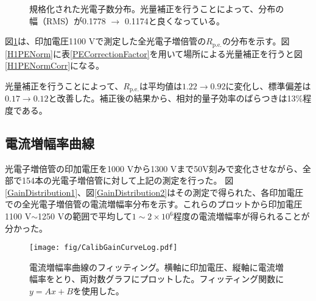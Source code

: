 \documentclass[11pt]{ltjsreport}
\newcommand{\figref}[1]{図\ref{#1}}
\newcommand{\tabref}[1]{表\ref{#1}}
\newcommand{\pe}{\mathrm{p.e.}}
\begin{document}
\begin{figure}[!h]
\centering
  \begin{minipage}{0.8\textwidth}
  \end{minipage}
  \begin{minipage}{0.8\textwidth}
  \end{minipage}
    \caption[規格化された光電子数分布]{規格化された光電子数分布。光量補正を行うことによって、分布の幅（RMS）が0.1778 $\rightarrow$ 0.1174と良くなっている。}
  \label{H1PECorr}
\end{figure}

\figref{H1PECorr}は、印加電圧1100 Vで測定した全光電子増倍管の$R_{\pe}$の分布を示す。\figref{H1PENorm}に\tabref{PECorrectionFactor}を用いて場所による光量補正を行うと\figref{H1PENormCorr}になる。

光量補正を行うことによって、$R_{\pe}$は平均値は$1.22 \rightarrow 0.92$に変化し、標準偏差は$0.17 \rightarrow 0.12$と改善した。補正後の結果から、相対的量子効率のばらつきは13\%程度である。




\subsection{電流増幅率曲線}
光電子増倍管の印加電圧を1000 Vから1300 Vまで50V刻みで変化させながら、全部で154本の光電子増倍管に対して上記の測定を行った。
\figref{GainDistribution1}、\figref{GainDistribution2}はその測定で得られた、各印加電圧での全光電子増倍管の電流増幅率分布を示す。これらのプロットから印加電圧1100 V$\sim$1250 Vの範囲で平均して$1\sim2\times 10^{6}$程度の電流増幅率が得られることが分かった。



\begin{figure}[htbp]
\centering
\texttt{[image: fig/CalibGainCurveLog.pdf]}
\caption[電流増幅率曲線のフィッティング]{電流増幅率曲線のフィッティング。横軸に印加電圧、縦軸に電流増幅率をとり、両対数グラフにプロットした。フィッティング関数に$y=Ax+B$を使用した。}
\label{GainCurve}
\end{figure}
\end{document}

